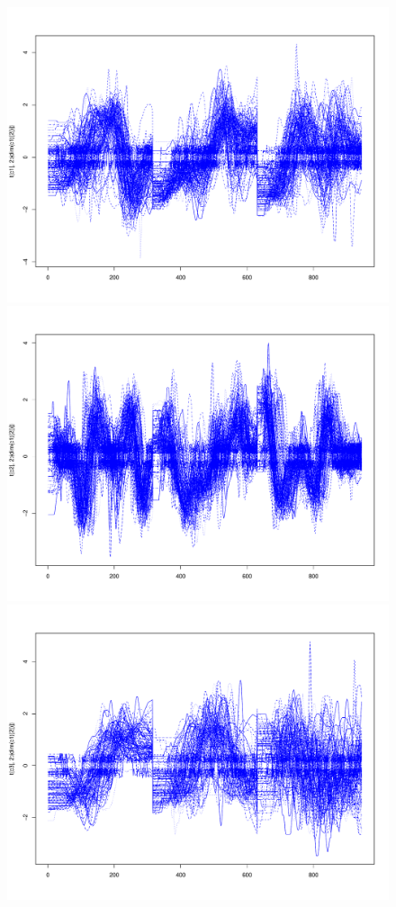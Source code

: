 \begin{figure}[h]
\center
\includegraphics[scale=0.1]{images/c1}
\includegraphics[scale=0.1]{images/c2}
\includegraphics[scale=0.1]{images/c3}

\end{figure}
